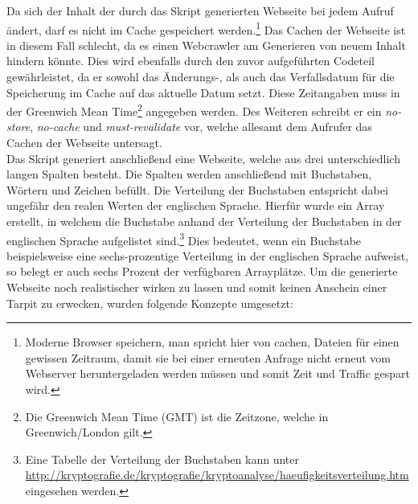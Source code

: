 Da sich der Inhalt der durch das Skript generierten Webseite bei jedem Aufruf ändert, darf es nicht im Cache gespeichert werden.\footnote{Moderne Browser speichern, man spricht hier von cachen, Dateien für einen gewissen Zeitraum, damit sie bei einer erneuten Anfrage nicht erneut vom Webserver heruntergeladen werden müssen und somit Zeit und Traffic gespart wird.} Das Cachen der Webseite ist in diesem Fall schlecht, da es einen Webcrawler am Generieren von neuem Inhalt hindern könnte. Dies wird ebenfalls durch den zuvor aufgeführten Codeteil gewährleistet, da er sowohl das Änderungs-, als auch das Verfallsdatum für die Speicherung im Cache auf das aktuelle Datum setzt. Diese Zeitangaben muss in der Greenwich Mean Time\footnote{Die Greenwich Mean Time (GMT) ist die Zeitzone, welche in Greenwich/London gilt.} angegeben werden.\cite{http-header-time} Des Weiteren schreibt er ein \emph{no-store}, \emph{no-cache} und \emph{must-revalidate} vor, welche allesamt dem Aufrufer das Cachen der Webseite untersagt.\\
Das Skript generiert anschließend eine Webseite, welche aus drei unterschiedlich langen Spalten besteht. Die Spalten werden anschließend mit Buchstaben, Wörtern und Zeichen befüllt. Die Verteilung der Buchstaben entspricht dabei ungefähr den realen Werten der englischen Sprache. Hierfür wurde ein Array erstellt, in welchem die Buchstabe anhand der Verteilung der Buchstaben in der englischen Sprache aufgelistet sind.\footnote{Eine Tabelle der Verteilung der Buchstaben kann unter \url{http://kryptografie.de/kryptografie/kryptoanalyse/haeufigkeitsverteilung.htm} eingesehen werden.}
 Dies bedeutet, wenn ein Buchstabe beispielsweise eine sechs-prozentige Verteilung in der englischen Sprache aufweist, so belegt er auch sechs Prozent der verfügbaren Arrayplätze. Um die generierte Webseite noch realistischer wirken zu lassen und somit keinen Anschein einer Tarpit zu erwecken, wurden folgende Konzepte umgesetzt:
